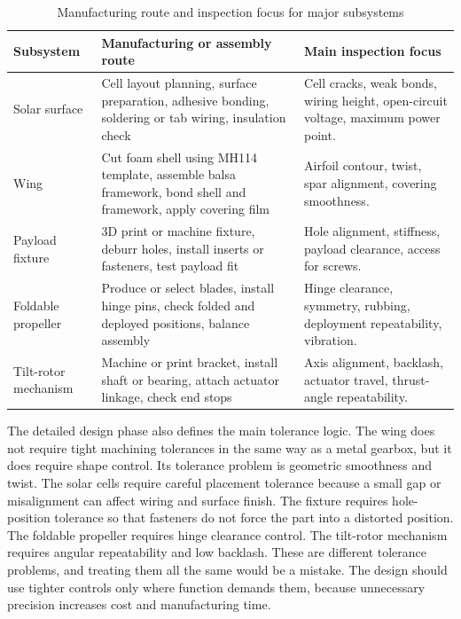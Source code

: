 \begin{table}[htbp]
    \centering
    \caption{Manufacturing route and inspection focus for major subsystems}
    \label{tab:manufacturing-route}
    \begin{tabular}{p{} p{} p{}}
        \toprule
        Subsystem & Manufacturing or assembly route & Main inspection focus \\
        \midrule
        Solar surface &
        Cell layout planning, surface preparation, adhesive bonding, soldering or tab wiring, insulation check &
        Cell cracks, weak bonds, wiring height, open-circuit voltage, maximum power point. \\
        Wing &
        Cut foam shell using MH114 template, assemble balsa framework, bond shell and framework, apply covering film &
        Airfoil contour, twist, spar alignment, covering smoothness. \\
        Payload fixture &
        3D print or machine fixture, deburr holes, install inserts or fasteners, test payload fit &
        Hole alignment, stiffness, payload clearance, access for screws. \\
        Foldable propeller &
        Produce or select blades, install hinge pins, check folded and deployed positions, balance assembly &
        Hinge clearance, symmetry, rubbing, deployment repeatability, vibration. \\
        Tilt-rotor mechanism &
        Machine or print bracket, install shaft or bearing, attach actuator linkage, check end stops &
        Axis alignment, backlash, actuator travel, thrust-angle repeatability. \\
        \bottomrule
    \end{tabular}
\end{table}

The detailed design phase also defines the main tolerance logic. The wing does not require tight machining tolerances in the same way as a metal gearbox, but it does require shape control. Its tolerance problem is geometric smoothness and twist. The solar cells require careful placement tolerance because a small gap or misalignment can affect wiring and surface finish. The fixture requires hole-position tolerance so that fasteners do not force the part into a distorted position. The foldable propeller requires hinge clearance control. The tilt-rotor mechanism requires angular repeatability and low backlash. These are different tolerance problems, and treating them all the same would be a mistake. The design should use tighter controls only where function demands them, because unnecessary precision increases cost and manufacturing time.

